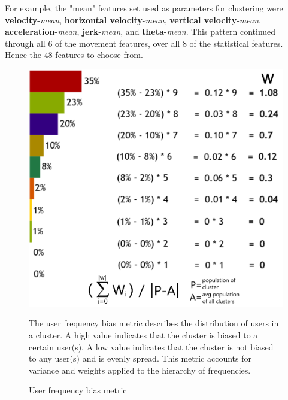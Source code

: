 For example, the "mean" features set used as parameters for clustering were \textbf{velocity}-\textit{mean}, \textbf{horizontal velocity}-\textit{mean}, \textbf{vertical velocity}-\textit{mean}, \textbf{acceleration}-\textit{mean}, \textbf{jerk}-\textit{mean}, and \textbf{theta}-\textit{mean}. This pattern continued through all 6 of the movement features, over all 8 of the statistical features. Hence the 48 features to choose from.

\begin{figure}[h!]
	\includegraphics[width=.8\columnwidth]{figures/user_freq_distribution}

	\caption{User frequency bias metric}
	\label{fig:user_freq_bias_metric}
	{\small The user frequency bias metric describes the distribution of users in a cluster. A high value indicates that the cluster is biased to a certain user(s). A low value indicates that the cluster is not biased to any user(s) and is evenly spread. This metric accounts for variance and weights applied to the hierarchy of frequencies.}
\end{figure}

%
